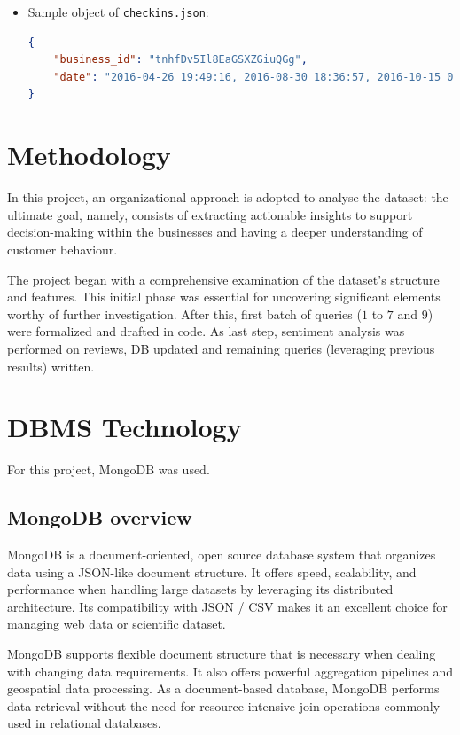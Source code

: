 \documentclass{Configuration_Files/PoliMi3i_thesis}
\begin{document}
\begin{itemize}
\bigskip

\item Sample object of \texttt{checkins.json}:
\bigskip
\begin{lstlisting}[language=json]
{
    "business_id": "tnhfDv5Il8EaGSXZGiuQGg",
    "date": "2016-04-26 19:49:16, 2016-08-30 18:36:57, 2016-10-15 02:45:18, 2016-11-18 01:54:50, 2017-04-20 18:39:06, 2017-05-03 17:58:02"
}
\end{lstlisting}

\end{itemize}

\section{Methodology}
In this project, an organizational approach is adopted to analyse the dataset: the ultimate goal, namely, consists of extracting actionable insights to support decision-making within the businesses and having a deeper understanding of customer behaviour. 

\bigskip

The project began with a comprehensive examination of the dataset’s structure and features. This initial phase was essential for uncovering significant elements worthy of further investigation. After this, first batch of queries ($1$ to $7$ and $9$) were formalized and drafted in code. As last step, sentiment analysis was performed on reviews, DB updated and remaining queries (leveraging previous results) written.  

\section{DBMS Technology}
For this project, MongoDB was used.

\subsection{MongoDB overview}
MongoDB is a document-oriented, open source database system that organizes data using a JSON-like document structure. It offers speed, scalability, and performance when handling large datasets by leveraging its distributed architecture. Its compatibility with JSON / CSV makes it an excellent choice for managing web data or scientific dataset.

MongoDB supports flexible document structure that is necessary when dealing with changing data requirements. It also offers powerful aggregation pipelines and geospatial data processing. As a document-based database, MongoDB performs data retrieval without the need for resource-intensive join operations commonly used in relational databases.
\end{document}
